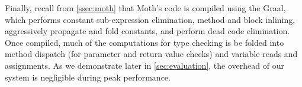 Finally, recall from \cref{ssec:moth} that
Moth's code is compiled using the Graal, 
which performs
constant sub-expression elimination,
method and block inlining,
aggressively propagate and fold constants, and
perform dead code elimination.
Once compiled, much of the computations for type checking
is be folded into method dispatch
(for parameter and return value checks)
and variable reads and assignments.
As we demonstrate later in \cref{sec:evaluation}, 
the overhead of our system is negligible during peak performance.
